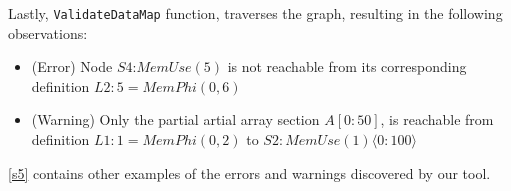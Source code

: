 Lastly, \texttt{ValidateDataMap} function, traverses the graph, 
resulting in the following observations:
\begin{itemize}
    \vspace{-5pt}
 \item (Error) Node $S4$:$MemUse(5)$ is not reachable from its 
corresponding  
 definition  $L2:5 = MemPhi(0,6)$ 
 \item (Warning) Only the partial artial array section $A[0:50]$, is reachable from definition
 $L1: 1 = MemPhi(0,2)$ to $S2:MemUse(1)\langle 0:100 \rangle $
\end{itemize}
\autoref{s5} contains other examples of the errors and warnings 
discovered by our tool. 
\vspace{-15pt}
% 
% 
